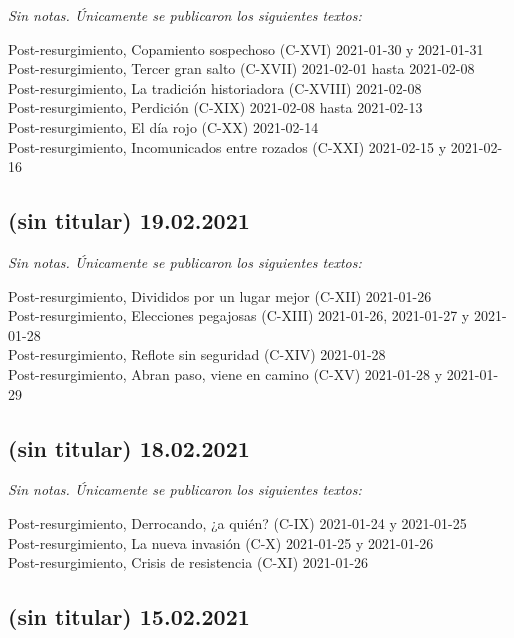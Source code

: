 \documentclass[
]{book}
\begin{document}
\emph{Sin notas. Únicamente se publicaron los siguientes textos:}

Post-resurgimiento, Copamiento sospechoso (C-XVI) 2021-01-30 y 2021-01-31~\\
Post-resurgimiento, Tercer gran salto (C-XVII) 2021-02-01 hasta 2021-02-08~\\
Post-resurgimiento, La tradición historiadora (C-XVIII) 2021-02-08~\\
Post-resurgimiento, Perdición (C-XIX) 2021-02-08 hasta 2021-02-13~\\
Post-resurgimiento, El día rojo (C-XX) 2021-02-14~\\
Post-resurgimiento, Incomunicados entre rozados (C-XXI) 2021-02-15 y 2021-02-16

\hypertarget{sin-titular-19.02.2021}{%
\subsection*{(sin titular) 19.02.2021}\label{sin-titular-19.02.2021}}

\emph{Sin notas. Únicamente se publicaron los siguientes textos:}

Post-resurgimiento, Divididos por un lugar mejor (C-XII) 2021-01-26~\\
Post-resurgimiento, Elecciones pegajosas (C-XIII) 2021-01-26, 2021-01-27 y 2021-01-28~\\
Post-resurgimiento, Reflote sin seguridad (C-XIV) 2021-01-28~\\
Post-resurgimiento, Abran paso, viene en camino (C-XV) 2021-01-28 y 2021-01-29

\hypertarget{sin-titular-18.02.2021}{%
\subsection*{(sin titular) 18.02.2021}\label{sin-titular-18.02.2021}}

\emph{Sin notas. Únicamente se publicaron los siguientes textos:}

Post-resurgimiento, Derrocando, ¿a quién? (C-IX) 2021-01-24 y 2021-01-25~\\
Post-resurgimiento, La nueva invasión (C-X) 2021-01-25 y 2021-01-26~\\
Post-resurgimiento, Crisis de resistencia (C-XI) 2021-01-26

\hypertarget{sin-titular-15.02.2021}{%
\subsection*{(sin titular) 15.02.2021}\label{sin-titular-15.02.2021}}
\end{document}
